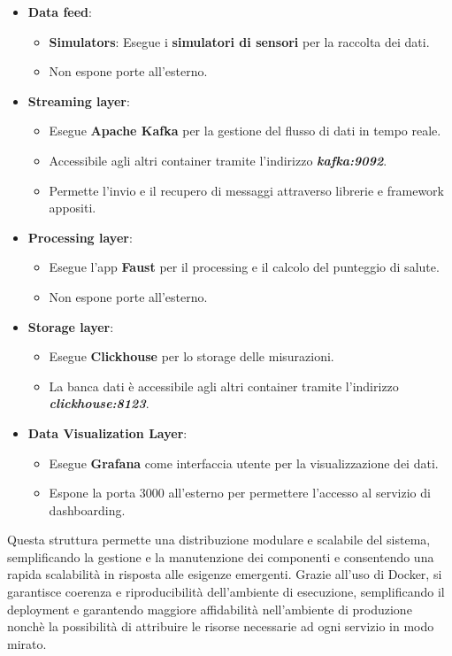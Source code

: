 \begin{itemize}
    \item \textbf{Data feed}:
    \begin{itemize}
        \item \textbf{Simulators}: Esegue i \textbf{simulatori di sensori} per la raccolta dei dati.
        \item  Non espone porte all’esterno.
    \end{itemize} 
    \item \textbf{Streaming layer}:
    \begin{itemize}
        \item Esegue \textbf{Apache Kafka} per la gestione del flusso di dati in tempo reale.
        \item Accessibile agli altri container tramite l'indirizzo \textit{\textbf{kafka:9092}}.
        \item Permette l'invio e il recupero di messaggi attraverso librerie e framework appositi.
    \end{itemize} 
    \item \textbf{Processing layer}:
    \begin{itemize}
        \item Esegue l'app \textbf{Faust} per il processing e il calcolo del punteggio di salute.
        \item Non espone porte all'esterno.
    \end{itemize}
    \item \textbf{Storage layer}:
    \begin{itemize}
        \item Esegue \textbf{Clickhouse} per lo storage delle misurazioni.
        \item La banca dati è accessibile agli altri container tramite l'indirizzo \textit{\textbf{clickhouse:8123}}.
    \end{itemize}
    \item \textbf{Data Visualization Layer}:
    \begin{itemize}
        \item Esegue \textbf{Grafana} come interfaccia utente per la visualizzazione dei dati.
        \item Espone la porta 3000 all'esterno per permettere l'accesso al servizio di dashboarding.
    \end{itemize}
\end{itemize}
Questa struttura permette una distribuzione modulare e scalabile del sistema, semplificando la gestione e la manutenzione dei componenti e consentendo una rapida scalabilità in risposta alle esigenze emergenti. Grazie all'uso di Docker, si garantisce coerenza e riproducibilità dell'ambiente di esecuzione, semplificando il deployment e garantendo maggiore affidabilità nell'ambiente di produzione nonchè la possibilità di attribuire le risorse necessarie ad ogni servizio in modo mirato.


